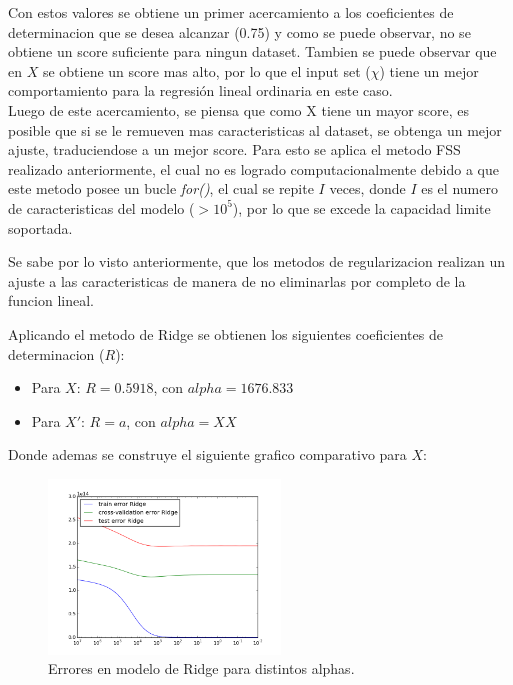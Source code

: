 \documentclass[10pt]{article}
\begin{document}
\begin{itemize}
Con estos valores se obtiene un primer acercamiento a los coeficientes de determinacion que se desea alcanzar (0.75) y como se puede observar, no se obtiene un score suficiente para ningun dataset. Tambien se puede observar que en $X$ se obtiene un score mas alto, por lo que el input set ($\chi$) tiene un mejor comportamiento para la regresión lineal ordinaria en este caso.\\

Luego de este acercamiento, se piensa que como X tiene un mayor score, es posible que si se le remueven mas caracteristicas al dataset, se obtenga un mejor ajuste, traduciendose a un mejor score. Para esto se aplica el metodo FSS realizado anteriormente, el cual no es logrado computacionalmente debido a que este metodo posee un bucle \textit{for()}, el cual se repite $I$ veces, donde $I$ es el numero de caracteristicas del modelo ($> 10^5$), por lo que se excede la capacidad limite soportada.

Se sabe por lo visto anteriormente, que los metodos de regularizacion realizan un ajuste a las caracteristicas de manera de no eliminarlas por completo de la funcion lineal.

Aplicando el metodo de Ridge se obtienen los siguientes coeficientes de determinacion ($R$):

\begin{itemize}

\item Para $X$: $R=0.5918$, con $alpha = 1676.833$
\item Para $X'$: $R=a$, con $alpha = XX$ 

\end{itemize}

Donde ademas se construye el siguiente grafico comparativo para $X$:

\begin{figure}[!htb]
    \centering
    \includegraphics[width=0.55\textwidth]{images/comparacion_ridge}
    \caption{Errores en modelo de Ridge para distintos alphas.}
    \label{err:lasso}
\end{figure}


\end{itemize}
\end{document}
